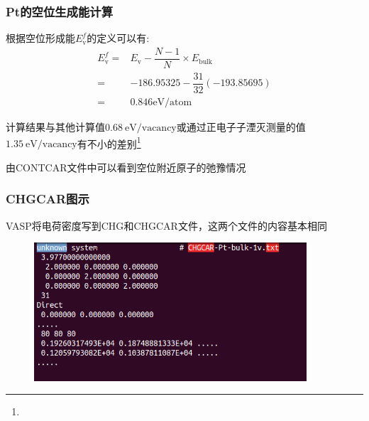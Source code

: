\frame
{
	\frametitle{\textrm{Pt}的空位生成能计算}
根据空位形成能$E_{\mathrm{v}}^f$的定义可以有:~
\begin{displaymath}
	\begin{aligned}
		E_{\mathrm{v}}^f=&E_{\mathrm{v}}-\dfrac{N-1}N\times E_{\mathrm{bulk}}\\
		=&-186.95325-\dfrac{31}{32}(-193.85695)\\
		=&0.846\mathrm{eV/atom}
	\end{aligned}
\end{displaymath}
{\fontsize{6.2pt}{5.2pt}}

计算结果与其他计算值$0.68\mathrm{~eV/vacancy}$或通过正电子子湮灭测量的值$1.35\mathrm{~eV/vacancy}$有不小的差别\footnote{\fontsize{6.2pt}{5.2pt}}

由\textrm{CONTCAR}文件中可以看到空位附近原子的弛豫情况%
}
\frame
{
	\frametitle{\textrm{CHGCAR}图示}
\textrm{VASP}将电荷密度写到\textrm{CHG}和\textrm{CHGCAR}文件，这两个文件的内容基本相同%
\begin{figure}[h!]
\centering
\vskip -5pt
\includegraphics[width=4.0in,viewport=0 20 490 240,clip]{Figures/Pt_vacancy-CONTCAR.png}
\caption{\fontsize{6.2pt}{5.2pt}}%
\label{Pt_vacancy-CHGCAR}
\end{figure}
}

